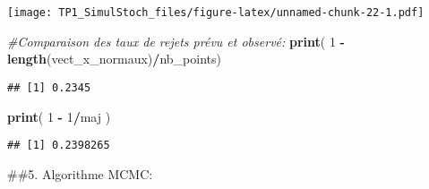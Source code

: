 \documentclass[]{article}
\newenvironment{Shaded}{\begin{snugshade}}{\end{snugshade}}
\newcommand{\CommentTok}[1]{\textcolor[rgb]{0.56,0.35,0.01}{\textit{#1}}}
\newcommand{\DecValTok}[1]{\textcolor[rgb]{0.00,0.00,0.81}{#1}}
\newcommand{\KeywordTok}[1]{\textcolor[rgb]{0.13,0.29,0.53}{\textbf{#1}}}
\newcommand{\NormalTok}[1]{#1}
\newcommand{\OperatorTok}[1]{\textcolor[rgb]{0.81,0.36,0.00}{\textbf{#1}}}
\newcommand{\StringTok}[1]{\textcolor[rgb]{0.31,0.60,0.02}{#1}}
\begin{document}
\texttt{[image: TP1\_SimulStoch\_files/figure-latex/unnamed-chunk-22-1.pdf]}

\begin{Shaded}
\begin{Highlighting}[]
\CommentTok{#Comparaison des taux de rejets prévu et observé:}
\KeywordTok{print}\NormalTok{( }\DecValTok{1} \OperatorTok{-}\StringTok{ }\KeywordTok{length}\NormalTok{(vect_x_normaux)}\OperatorTok{/}\NormalTok{nb_points)}
\end{Highlighting}
\end{Shaded}

\begin{verbatim}
## [1] 0.2345
\end{verbatim}

\begin{Shaded}
\begin{Highlighting}[]
\KeywordTok{print}\NormalTok{( }\DecValTok{1} \OperatorTok{-}\StringTok{ }\DecValTok{1}\OperatorTok{/}\NormalTok{maj )}
\end{Highlighting}
\end{Shaded}

\begin{verbatim}
## [1] 0.2398265
\end{verbatim}

\#\#5. Algorithme MCMC:
\end{document}
